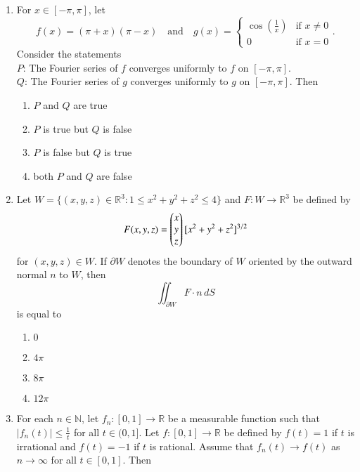 \documentclass[journal]{IEEEtran}
\numberwithin{equation}{enumi}
\numberwithin{figure}{enumi}
\begin{document}
\begin{enumerate}
\item
For $x \in [-\pi, \pi]$, let
\[
f(x) = (\pi + x)(\pi - x) \quad \text{and} \quad 
g(x) = 
\begin{cases}
\cos\left(\frac{1}{x}\right) & \text{if } x \neq 0 \\
0 & \text{if } x = 0
\end{cases}.
\]
Consider the statements\\
$P$: The Fourier series of $f$ converges uniformly to $f$ on $[-\pi, \pi]$.\\
$Q$: The Fourier series of $g$ converges uniformly to $g$ on $[-\pi, \pi]$. Then
\hfill{}
\begin{multicols}{2}
\begin{enumerate}
    \item $P$ and $Q$ are true
    \item $P$ is true but $Q$ is false
    \item $P$ is false but $Q$ is true
    \item both $P$ and $Q$ are false
\end{enumerate}
\end{multicols}


\item
Let $W = \{ (x, y, z) \in \mathbb{R}^3 : 1 \leq x^2 + y^2 + z^2 \leq 4 \}$ and $F: W \rightarrow \mathbb{R}^3$ be defined by
\[
F(x, y, z) = \begin{pmatrix}x \\ y \\ z\end{pmatrix} [x^2 + y^2 + z^2]^{3/2}
\]
for $(x, y, z) \in W$. If $\partial W$ denotes the boundary of $W$ oriented by the outward normal $n$ to $W$, then 
\[
\iint_{\partial W} F \cdot n \, dS
\]
is equal to
\hfill{}
\begin{multicols}{4}
\begin{enumerate}
    \item $0$
    \item $4\pi$
    \item $8\pi$
    \item $12\pi$
\end{enumerate}
\end{multicols}


\item
For each $n \in \mathbb{N}$, let $f_n : [0,1] \to \mathbb{R}$ be a measurable function such that $|f_n(t)| \leq \frac{1}{t}$ for all $t \in (0,1]$. Let $f : [0,1] \to \mathbb{R}$ be defined by $f(t) = 1$ if $t$ is irrational and $f(t) = -1$ if $t$ is rational. Assume that $f_n(t) \to f(t)$ as $n \to \infty$ for all $t \in [0,1]$. Then
\hfill{}


\end{enumerate}
\end{document}
